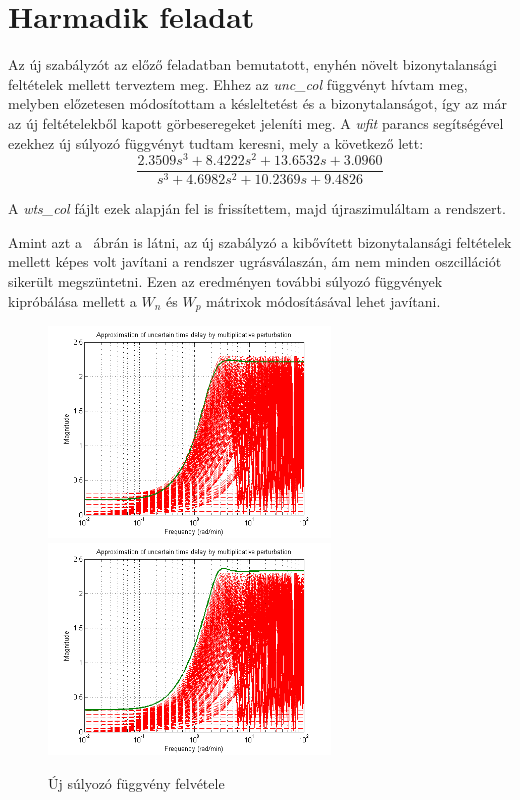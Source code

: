 \newpage
\section{Harmadik feladat}
Az új szabályzót az előző feladatban bemutatott, enyhén növelt bizonytalansági feltételek mellett terveztem meg. Ehhez az \textit{unc\_col} függvényt hívtam meg, melyben előzetesen módosítottam a késleltetést és a bizonytalanságot, így az már az új feltételekből kapott görbeseregeket jeleníti meg. A \textit{wfit} parancs segítségével ezekhez új súlyozó függvényt tudtam keresni, mely a következő lett:
\begin{equation}\label{NewWeight}
\frac{2.3509    s^{3}+8.4222   s^{2}+13.6532s+    3.0960}{s^{3}+4.6982  s^{2}+ 10.2369    s+9.4826}
\end{equation}

A \textit{wts\_col} fájlt ezek alapján fel is frissítettem, majd újraszimuláltam a rendszert.


Amint azt a ~ábrán is látni, az új szabályzó a kibővített bizonytalansági feltételek mellett képes volt javítani a rendszer ugrásválaszán, ám nem minden oszcillációt sikerült megszüntetni. Ezen az eredményen további súlyozó függvények kipróbálása mellett a $W_n$ és $W_p$ mátrixok módosításával lehet javítani.



\begin{figure}[!ht]
	\includegraphics[width=75mm,keepaspectratio]{figures/2m06/unc_col_before.png}
	\includegraphics[width=75mm,keepaspectratio]{figures/2m06/unc_col_after.png}
	\caption{Új súlyozó függvény felvétele}
	\label{fig:Unc}
\end{figure}



